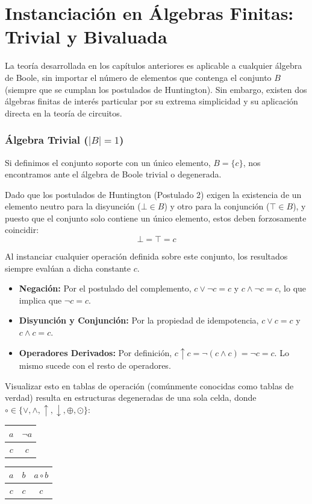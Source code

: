 \chapter[Álgebras Finitas: Trivial y Bivaluada]{Instanciación en Álgebras Finitas: Trivial y Bivaluada}

La teoría desarrollada en los capítulos anteriores es aplicable a cualquier álgebra de Boole, sin importar el número de elementos que contenga el conjunto $B$ (siempre que se cumplan los postulados de Huntington). Sin embargo, existen dos álgebras finitas de interés particular por su extrema simplicidad y su aplicación directa en la teoría de circuitos.

\subsection{Álgebra Trivial ($|B| = 1$)}
Si definimos el conjunto soporte con un único elemento, $B = \{ c \}$, nos encontramos ante el álgebra de Boole trivial o degenerada. 

Dado que los postulados de Huntington (Postulado 2) exigen la existencia de un elemento neutro para la disyunción ($\bot \in B$) y otro para la conjunción ($\top \in B$), y puesto que el conjunto solo contiene un único elemento, estos deben forzosamente coincidir:
\[ \bot = \top = c \]

Al instanciar cualquier operación definida sobre este conjunto, los resultados siempre evalúan a dicha constante $c$. 
\begin{itemize}
    \item \textbf{Negación:} Por el postulado del complemento, $c \vee \neg c = c$ y $c \wedge \neg c = c$, lo que implica que $\neg c = c$.
    \item \textbf{Disyunción y Conjunción:} Por la propiedad de idempotencia, $c \vee c = c$ y $c \wedge c = c$.
    \item \textbf{Operadores Derivados:} Por definición, $c \uparrow c = \neg (c \wedge c) = \neg c = c$. Lo mismo sucede con el resto de operadores.
\end{itemize}

Visualizar esto en tablas de operación (comúnmente conocidas como tablas de verdad) resulta en estructuras degeneradas de una sola celda, donde $\circ \in \{ \vee, \wedge, \uparrow, \downarrow, \oplus, \odot \}$:

\begin{center}
\begin{tabular}{c|c}
$a$ & $\neg a$ \\
\hline
$c$ & $c$
\end{tabular}
\qquad
\begin{tabular}{cc|c}
$a$ & $b$ & $a \circ b$ \\
\hline
$c$ & $c$ & $c$
\end{tabular}
\end{center}

